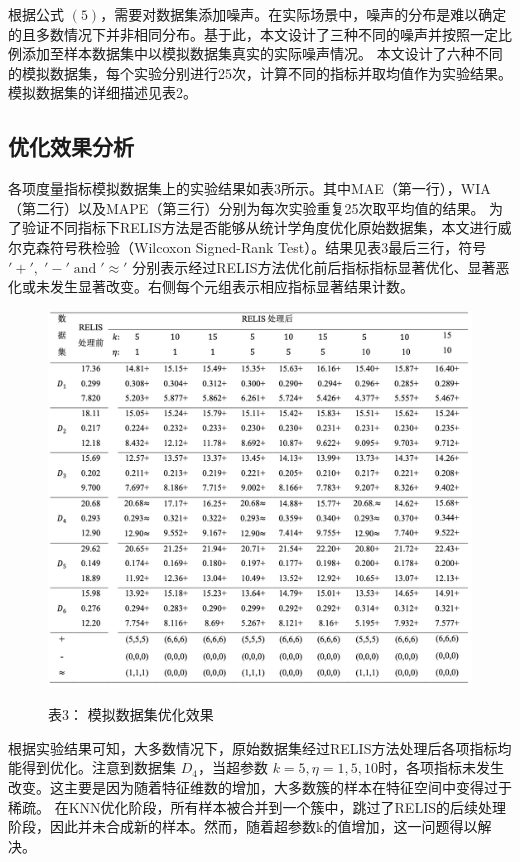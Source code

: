 \documentclass[12pt,a4paper]{article}%
\begin{document}
	根据公式 $(5)$，需要对数据集添加噪声。在实际场景中，噪声的分布是难以确定的且多数情况下并非相同分布。基于此，本文设计了三种不同的噪声并按照一定比例添加至样本数据集中以模拟数据集真实的实际噪声情况\cite{bib25}。
	本文设计了六种不同的模拟数据集，每个实验分别进行25次，计算不同的指标并取均值作为实验结果。模拟数据集的详细描述见表2。



	\subsection{优化效果分析}
	各项度量指标模拟数据集上的实验结果如表3所示。其中MAE（第一行），WIA（第二行）以及MAPE（第三行）分别为每次实验重复25次取平均值的结果。
	为了验证不同指标下RELIS方法是否能够从统计学角度优化原始数据集，本文进行威尔克森符号秩检验（Wilcoxon Signed-Rank Test）。结果见表3最后三行，符号$'+',\;{'-'}\;\text{and}\;{'}{\approx}' $
	分别表示经过RELIS方法优化前后指标指标显著优化、显著恶化或未发生显著改变。右侧每个元组表示相应指标显著结果计数\cite{bib26}。

	\begin{figure}[b!]
		\centering
		\caption*{表3： 模拟数据集优化效果}
		\includegraphics[width=1.0\textwidth]{模拟实验结果.jpg}
		\label{tab3}
	\end{figure}

	根据实验结果可知，大多数情况下，原始数据集经过RELIS方法处理后各项指标均能得到优化。注意到数据集 $D_4$，当超参数 $k=5,\eta=1,5,10$时，各项指标未发生改变。这主要是因为随着特征维数的增加，大多数簇的样本在特征空间中变得过于稀疏。
	在KNN优化阶段，所有样本被合并到一个簇中，跳过了RELIS的后续处理阶段，因此并未合成新的样本。然而，随着超参数k的值增加，这一问题得以解决。
\end{document}
